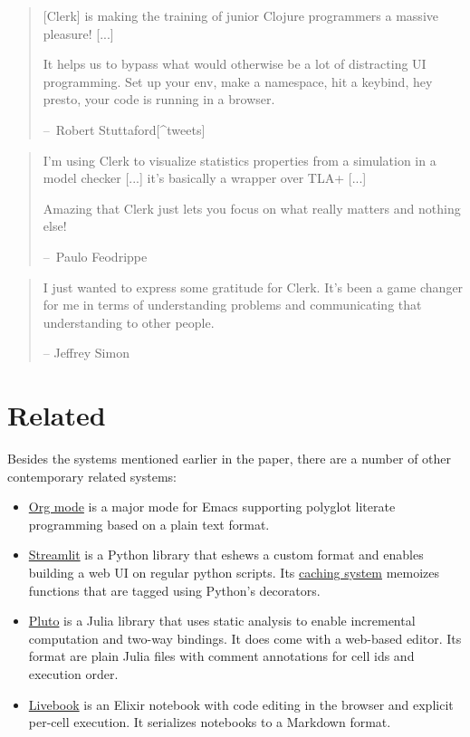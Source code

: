 \documentclass[sigconf,screen]{acmart}
\providecommand{\tightlist}{%
  \setlength{\itemsep}{0pt}\setlength{\parskip}{0pt}}
\begin{document}
\begin{quote}
{[}Clerk{]} is making the training of junior Clojure programmers a massive pleasure! {[}...{]}

It helps us to bypass what would otherwise be a lot of distracting UI programming. Set up your env, make a namespace, hit a keybind, hey presto, your code is running in a browser.

--~Robert Stuttaford{[}\^{}tweets{]}
\end{quote}

\begin{quote}
I'm using Clerk to visualize statistics properties from a simulation in a model checker {[}...{]} it's basically a wrapper over TLA+ {[}...{]}

Amazing that Clerk just lets you focus on what really matters and nothing else!

--~Paulo Feodrippe
\end{quote}

\begin{quote}
I just wanted to express some gratitude for Clerk. It's been a game changer for me in terms of understanding problems and communicating that understanding to other people.

-- Jeffrey Simon
\end{quote}

\hypertarget{id}{%
\section{Related}\label{id}}

Besides the systems mentioned earlier in the paper, there are a number of other contemporary related systems:

\begin{itemize}
\tightlist
\item
  \href{https://orgmode.org}{Org mode} is a major mode for Emacs supporting polyglot literate programming based on a plain text format.
\item
  \href{https://streamlit.io}{Streamlit} is a Python library that eshews a custom format and enables building a web UI on regular python scripts. Its \href{https://docs.streamlit.io/library/get-started/main-concepts\#caching}{caching system} memoizes functions that are tagged using Python's decorators.
\item
  \href{https://plutojl.org}{Pluto} is a Julia library that uses static analysis to   enable incremental computation and two-way bindings. It does come with a web-based editor. Its format are plain Julia files with comment annotations for cell ids and execution order.
\item
  \href{https://livebook.dev}{Livebook} is an Elixir notebook with code editing in the browser and explicit per-cell execution. It serializes notebooks to a Markdown format.
\end{itemize}
\end{document}
